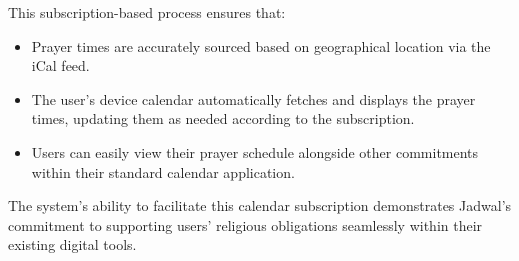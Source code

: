 This subscription-based process ensures that:
\begin{itemize}
  \item Prayer times are accurately sourced based on geographical location via the iCal feed.
  \item The user's device calendar automatically fetches and displays the prayer times, updating them as needed according to the subscription.
  \item Users can easily view their prayer schedule alongside other commitments within their standard calendar application.
\end{itemize}

The system's ability to facilitate this calendar subscription demonstrates Jadwal's commitment to supporting users' religious obligations seamlessly within their existing digital tools.

